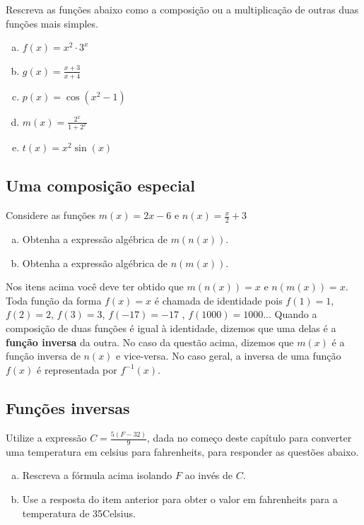 \documentclass[main_estudante.tex]{subfiles}
\begin{document}
\begin{questao}
Rescreva as funções abaixo como a composição ou a multiplicação de outras duas funções mais simples.
\begin{enumerate}[a)]
\item $f(x)=x^2 \cdot 3^x$
\item $g(x)=\frac{x+3}{x+4}$
\item $p(x)=\cos(x^2-1)$
\item $m(x)=\frac{2^x}{1+2^x}$
\item $t(x)=x^2\sin(x)$
\end{enumerate}
\end{questao}

\subsection*{Uma composição especial}

\begin{questao}
Considere as funções $m(x)=2x-6$ e $n(x)=\frac{x}{2}+3$
\begin{enumerate}[a)]
\item Obtenha a expressão algébrica de $m(n(x))$.
\item Obtenha a expressão algébrica de $n(m(x))$.
\end{enumerate}
\end{questao}

Nos itens acima você deve ter obtido que $m(n(x))=x$ e $n(m(x))=x$. Toda função da forma $f(x)=x$ é chamada de identidade pois $f(1)=1$, $f(2)=2$, $f(3)=3$, $f(-17)=-17$ , $f(1000)=1000$... Quando a composição de duas funções é igual à identidade, dizemos que uma delas é a \textbf{função inversa} da outra. No caso da questão acima, dizemos que $m(x)$ é a função inversa de $n(x)$ e vice-versa. No caso geral, a inversa de uma função $f(x)$ é representada por $f^{-1}(x)$.

\subsection*{Funções inversas}

\begin{questao}
Utilize a expressão $C=\frac{5(F-32)}{9}$, dada no começo deste capítulo para converter uma temperatura em celsius para fahrenheits, para responder as questões abaixo.
\begin{enumerate}[a)]
\item Rescreva a fórmula acima isolando $F$ ao invés de $C$.
\item Use a resposta do item anterior para obter o valor em fahrenheits para a temperatura de 35\degree Celsius.
\end{enumerate}
\end{questao}
\end{document}
